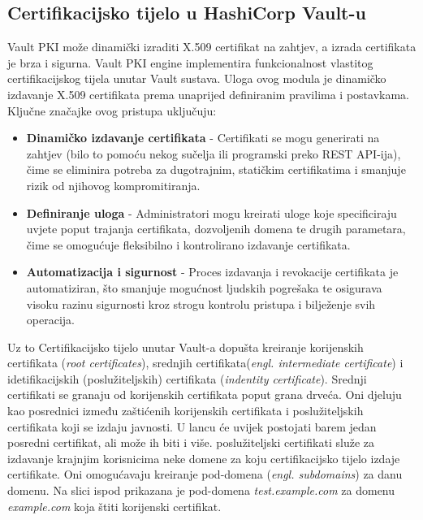 \documentclass[]{foi}
\begin{document}
\subsection{Certifikacijsko tijelo u HashiCorp Vault-u}

Vault PKI može dinamički izraditi X.509 certifikat na zahtjev, a izrada certifikata je brza i sigurna. \cite{hashicorp-vault-pki-engine} Vault PKI engine implementira funkcionalnost vlastitog certifikacijskog tijela unutar Vault sustava. Uloga ovog modula je dinamičko izdavanje X.509 certifikata prema unaprijed definiranim pravilima i postavkama. Ključne značajke ovog pristupa uključuju:

\begin{itemize}
    \item \textbf{Dinamičko izdavanje certifikata} - Certifikati se mogu generirati na zahtjev (bilo to pomoću nekog sučelja ili programski preko REST API-ija), čime se eliminira potreba za dugotrajnim, statičkim certifikatima i smanjuje rizik od njihovog kompromitiranja.
    \item \textbf{Definiranje uloga} - Administratori mogu kreirati uloge koje specificiraju uvjete poput trajanja certifikata, dozvoljenih domena te drugih parametara, čime se omogućuje fleksibilno i kontrolirano izdavanje certifikata.
    \item \textbf{Automatizacija i sigurnost} - Proces izdavanja i revokacije certifikata je automatiziran, što smanjuje mogućnost ljudskih pogrešaka te osigurava visoku razinu sigurnosti kroz strogu kontrolu pristupa i bilježenje svih operacija.
\end{itemize}

Uz to Certifikacijsko tijelo unutar Vault-a dopušta kreiranje korijenskih certifikata (\textit{root certificates}), srednjih certifikata(\textit{engl. intermediate certificate}) i idetifikacijskih (poslužiteljskih) certifikata (\textit{indentity certificate}). Srednji certifikati se granaju od korijenskih certifikata poput grana drveća. Oni djeluju kao posrednici između zaštićenih korijenskih certifikata i poslužiteljskih certifikata koji se izdaju javnosti. U lancu će uvijek postojati barem jedan posredni certifikat, ali može ih biti i više. poslužiteljski certifikati služe za izdavanje krajnjim korisnicima neke domene za koju certifikacijsko tijelo izdaje certifikate. Oni omogućavaju kreiranje pod-domena (\textit{engl. subdomains}) za danu domenu. Na slici ispod prikazana je pod-domena \textit{test.example.com} za domenu \textit{example.com} koja štiti korijenski certifikat.
\end{document}
